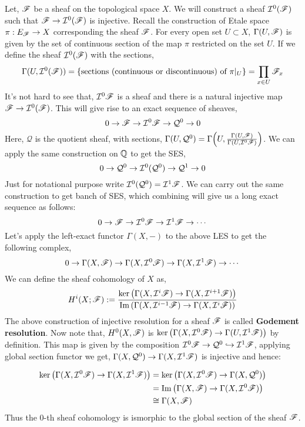 \documentclass[11pt]{article}
\begin{document}
 Let, $\mathscr{F}$ be a sheaf on the topological space $X$. We will construct a sheaf $\mathcal{I}^0(\mathscr{F})$ such that $\mathscr{F} \to \mathcal{I}^0(\mathscr{F})$ is injective. Recall the construction of Etale space $\pi:E_{\mathscr{F}} \to X$ corresponding the sheaf ${\mathscr{F}}$. For every open set $U \subset X$, $\Gamma(U,\mathscr{F})$ is given by the set of continuous section of the map $\pi$ restricted on the set $U$. If we define the sheaf $\mathcal{I}^{0}(\mathscr{F})$ with the sections,  $$\Gamma(U,\mathcal{I}^{0}(\mathscr{F})) = \qty{\text{sections (continuous or discontinuous) of }\pi|_{U}}=\prod_{x \in U} \mathscr{F}_x$$
It's not hard to see that, $\mathcal{I}^{0}\mathscr{F}$ is a sheaf and there is a natural injective map $\mathscr{F} \to \mathcal{I}^0(\mathscr{F})$. This will give rise to an exact sequence of sheaves, $$0 \to \mathscr{F} \to \mathcal{I}^{0}\mathscr{F} \to \mathcal{Q}^{0} \to 0$$ Here, $\mathcal{Q}$ is the quotient sheaf, with sections, $\Gamma(U,\mathcal{Q}^0)= \Gamma\qty(U,\frac{\Gamma(U,\mathscr{F})}{\Gamma(U,\mathcal{I}^0\mathscr{F})})$. We can apply the same construction on $\mathbb{Q}$ to get the SES, $$0 \to \mathcal{Q}^0 \to \mathcal{I}^{0}(\mathcal{Q}^0) \to \mathcal{Q}^{1} \to 0$$ Just for notational purpose write $\mathcal{I}^0(\mathcal{Q}^0) = \mathcal{I}^1\mathscr{F}$. We can carry out the same construction to get banch of SES, which combining will give us a long exact sequence as follows: $$0 \to \mathscr{F} \to \mathcal{I}^{0}\mathscr{F} \to \mathcal{I}^{1}\mathscr{F} \to \cdots $$
Let's apply the left-exact functor $\Gamma(X,-)$ to the above LES to get the following complex, $$0 \to \Gamma(X,\mathscr{F}) \to \Gamma(X,\mathcal{I}^{0}\mathscr{F}) \to \Gamma(X,\mathcal{I}^{1}\mathscr{F}) \to \cdots$$
We can define the sheaf cohomology of $X$ as, $$H^i(X;\mathscr{F}) := \frac{\ker\qty(\Gamma(X,\mathcal{I}^{i}\mathscr{F}) \to \Gamma(X,\mathcal{I}^{i+1}\mathscr{F}))}{\operatorname{Im} \qty(\Gamma(X,\mathcal{I}^{i-1}\mathscr{F}) \to \Gamma(X,\mathcal{I}^{i}\mathscr{F}))}$$
The above construction of injective resolution for a sheaf $\mathscr{F}$ is called \textbf{Godement resolution}. Now note that, $H^0(X,\mathscr{F})$ is $\ker \qty( \Gamma(X, \mathcal{I}^0\mathscr{F}) \to \Gamma(U,\mathcal{I}^1\mathscr{F}))$ by definition. This map is given by the composition $\mathcal{I}^{0}\mathscr{F} \to \mathcal{Q}^0 \hookrightarrow \mathcal{I}^1\mathscr{F}$, applying global section functor we get, $\Gamma(X,\mathcal{Q}^0) \to \Gamma(X,\mathcal{I}^1\mathscr{F})$ is injective and hence:

\begin{align*}
  \ker \qty( \Gamma(X, \mathcal{I}^0\mathscr{F}) \to \Gamma(X,\mathcal{I}^1\mathscr{F})) &= \ker \qty(\Gamma(X, \mathcal{I}^0\mathscr{F}) \to \Gamma(X,\mathcal{Q}^0)) \\
  &= \operatorname{Im} \qty(\Gamma(X,\mathscr{F}) \to \Gamma(X,\mathcal{I}^0\mathscr{F})) \\
  & \cong \Gamma(X,\mathscr{F})
\end{align*}
Thus the $0$-th sheaf cohomology is ismorphic to the global section of the sheaf $\mathscr{F}$. 
\end{document}
